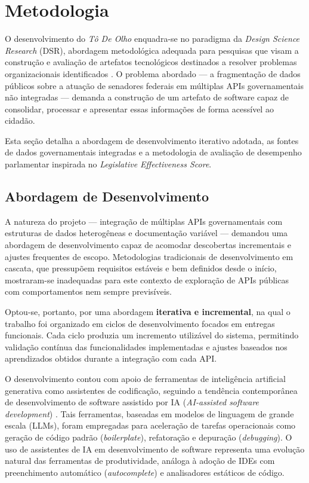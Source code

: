 \section{Metodologia}
\label{sec:metodologia}

O desenvolvimento do \textit{Tô De Olho} enquadra-se no paradigma da \textit{Design Science Research} (DSR), abordagem metodológica adequada para pesquisas que visam a construção e avaliação de artefatos tecnológicos destinados a resolver problemas organizacionais identificados \cite{hevner2004design}. O problema abordado --- a fragmentação de dados públicos sobre a atuação de senadores federais em múltiplas APIs governamentais não integradas --- demanda a construção de um artefato de software capaz de consolidar, processar e apresentar essas informações de forma acessível ao cidadão.

Esta seção detalha a abordagem de desenvolvimento iterativo adotada, as fontes de dados governamentais integradas e a metodologia de avaliação de desempenho parlamentar inspirada no \textit{Legislative Effectiveness \textit{Score}}.

\subsection{Abordagem de Desenvolvimento}

A natureza do projeto --- integração de múltiplas APIs governamentais com estruturas de dados heterogêneas e documentação variável --- demandou uma abordagem de desenvolvimento capaz de acomodar descobertas incrementais e ajustes frequentes de escopo. Metodologias tradicionais de desenvolvimento em cascata, que pressupõem requisitos estáveis e bem definidos desde o início, mostraram-se inadequadas para este contexto de exploração de APIs públicas com comportamentos nem sempre previsíveis.

Optou-se, portanto, por uma abordagem \textbf{iterativa e incremental}, na qual o trabalho foi organizado em ciclos de desenvolvimento focados em entregas funcionais. Cada ciclo produzia um incremento utilizável do sistema, permitindo validação contínua das funcionalidades implementadas e ajustes baseados nos aprendizados obtidos durante a integração com cada API.

O desenvolvimento contou com apoio de ferramentas de inteligência artificial generativa como assistentes de codificação, seguindo a tendência contemporânea de desenvolvimento de software assistido por IA (\textit{AI-assisted software development}) \cite{peng2023impact}. Tais ferramentas, baseadas em modelos de linguagem de grande escala (LLMs), foram empregadas para aceleração de tarefas operacionais como geração de código padrão (\textit{boilerplate}), refatoração e depuração (\textit{debugging}). O uso de assistentes de IA em desenvolvimento de software representa uma evolução natural das ferramentas de produtividade, análoga à adoção de IDEs com preenchimento automático (\textit{autocomplete}) e analisadores estáticos de código.

